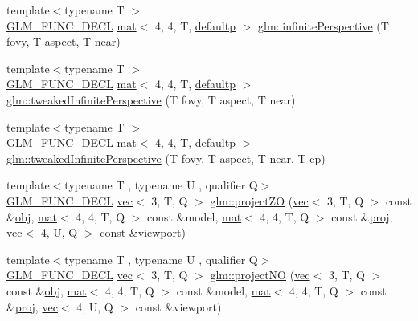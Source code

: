 \begin{DoxyCompactItemize}
\item 
{\footnotesize template$<$typename T $>$ }\\\hyperlink{setup_8hpp_ab2d052de21a70539923e9bcbf6e83a51}{G\+L\+M\+\_\+\+F\+U\+N\+C\+\_\+\+D\+E\+CL} \hyperlink{structglm_1_1mat}{mat}$<$ 4, 4, T, \hyperlink{namespaceglm_a36ed105b07c7746804d7fdc7cc90ff25a9d21ccd8b5a009ec7eb7677befc3bf51}{defaultp} $>$ \hyperlink{group__gtc__matrix__transform_ga44fa38a18349450325cae2661bb115ca}{glm\+::infinite\+Perspective} (T fovy, T aspect, T near)
\item 
{\footnotesize template$<$typename T $>$ }\\\hyperlink{setup_8hpp_ab2d052de21a70539923e9bcbf6e83a51}{G\+L\+M\+\_\+\+F\+U\+N\+C\+\_\+\+D\+E\+CL} \hyperlink{structglm_1_1mat}{mat}$<$ 4, 4, T, \hyperlink{namespaceglm_a36ed105b07c7746804d7fdc7cc90ff25a9d21ccd8b5a009ec7eb7677befc3bf51}{defaultp} $>$ \hyperlink{group__gtc__matrix__transform_gaaeacc04a2a6f4b18c5899d37e7bb3ef9}{glm\+::tweaked\+Infinite\+Perspective} (T fovy, T aspect, T near)
\item 
{\footnotesize template$<$typename T $>$ }\\\hyperlink{setup_8hpp_ab2d052de21a70539923e9bcbf6e83a51}{G\+L\+M\+\_\+\+F\+U\+N\+C\+\_\+\+D\+E\+CL} \hyperlink{structglm_1_1mat}{mat}$<$ 4, 4, T, \hyperlink{namespaceglm_a36ed105b07c7746804d7fdc7cc90ff25a9d21ccd8b5a009ec7eb7677befc3bf51}{defaultp} $>$ \hyperlink{group__gtc__matrix__transform_gaf5b3c85ff6737030a1d2214474ffa7a8}{glm\+::tweaked\+Infinite\+Perspective} (T fovy, T aspect, T near, T ep)
\item 
{\footnotesize template$<$typename T , typename U , qualifier Q$>$ }\\\hyperlink{setup_8hpp_ab2d052de21a70539923e9bcbf6e83a51}{G\+L\+M\+\_\+\+F\+U\+N\+C\+\_\+\+D\+E\+CL} \hyperlink{structglm_1_1vec}{vec}$<$ 3, T, Q $>$ \hyperlink{group__gtc__matrix__transform_ga77d157525063dec83a557186873ee080}{glm\+::project\+ZO} (\hyperlink{structglm_1_1vec}{vec}$<$ 3, T, Q $>$ const \&\hyperlink{_s_d_l__opengl__glext_8h_a0c0d4701a6c89f4f7f0640715d27ab26}{obj}, \hyperlink{structglm_1_1mat}{mat}$<$ 4, 4, T, Q $>$ const \&model, \hyperlink{structglm_1_1mat}{mat}$<$ 4, 4, T, Q $>$ const \&\hyperlink{group__gtx__projection_ga58384b7170801dd513de46f87c7fb00e}{proj}, \hyperlink{structglm_1_1vec}{vec}$<$ 4, U, Q $>$ const \&viewport)
\item 
{\footnotesize template$<$typename T , typename U , qualifier Q$>$ }\\\hyperlink{setup_8hpp_ab2d052de21a70539923e9bcbf6e83a51}{G\+L\+M\+\_\+\+F\+U\+N\+C\+\_\+\+D\+E\+CL} \hyperlink{structglm_1_1vec}{vec}$<$ 3, T, Q $>$ \hyperlink{group__gtc__matrix__transform_ga05249751f48d14cb282e4979802b8111}{glm\+::project\+NO} (\hyperlink{structglm_1_1vec}{vec}$<$ 3, T, Q $>$ const \&\hyperlink{_s_d_l__opengl__glext_8h_a0c0d4701a6c89f4f7f0640715d27ab26}{obj}, \hyperlink{structglm_1_1mat}{mat}$<$ 4, 4, T, Q $>$ const \&model, \hyperlink{structglm_1_1mat}{mat}$<$ 4, 4, T, Q $>$ const \&\hyperlink{group__gtx__projection_ga58384b7170801dd513de46f87c7fb00e}{proj}, \hyperlink{structglm_1_1vec}{vec}$<$ 4, U, Q $>$ const \&viewport)

\end{DoxyCompactItemize}
